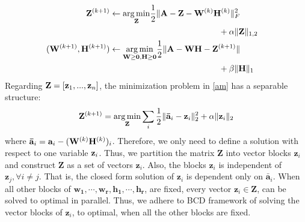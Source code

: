 \begin{equation}
\begin{aligned}
\label{am}
\mathbf{Z}^{(k+1)} & \leftarrow \underset{\mathbf{Z}}{\mathop{\rm arg\,min}} \frac{1}{2}\|\mathbf{A}-\mathbf{Z}-\mathbf{W}^{(k)}\mathbf{H}^{(k)}\|_F^2 \\
                    &\qquad \qquad \qquad \qquad \qquad \qquad \quad     + \alpha \|\mathbf{Z}\|_{1,2}    \\
(\mathbf{W}^{(k+1)},\mathbf{H}^{(k+1)}) & \leftarrow \underset{\mathbf{W\geq0}, \mathbf{H\geq0}}{\mathop{\rm arg\,min}} \frac{1}{2}\|\mathbf{A}-\mathbf{WH}-\mathbf{Z}^{(k+1)}\|  \\
                                        & \qquad \qquad \qquad \qquad \qquad \qquad \quad + \beta \|\mathbf{H}\|_1 &    \\
\end{aligned}
\end{equation}
Regarding ${\bf Z}=[{\bf z}_1,...,{\bf z}_n]$, the minimization
problem in \eqref{am} has a  separable structure:
$$
\mathbf{Z}^{(k+1)} =  \underset{\mathbf{Z}}{\mathop{\rm arg\,min}} \sum_i \frac{1}{2}\|\mathbf{\bar{a}}_i -\mathbf{z}_i\|_2^2+ \alpha \|\mathbf{z}_i\|_{2}
$$
where $\mathbf{\bar{a}}_i = {\bf a}_i - ({\bf W}^{(k)}{\bf
H}^{(k)})_i$. Therefore, we only need to define a solution with
respect to one variable ${\bf z}_i$. Thus, we partition the matrix
$\mathbf{Z}$ into vector blocks $\mathbf{z}_i$ and construct
$\mathbf{Z}$ as a set of vectors $\mathbf{z}_i$. Also, the blocks
$\mathbf{z}_i$ is independent of $\mathbf{z}_j, \forall i \neq j$.
That is, the closed form solution of $\mathbf{z}_i$ is dependent
only on $\mathbf{\bar{a}}_i$. When all other blocks of
$\mathbf{w_1,\cdots,w_r,h_1,\cdots,h_r}$, are fixed, every vector
$\mathbf{z}_i \in \mathbf{Z}$, can be solved to optimal in parallel.
Thus, we adhere to BCD framework of solving the vector blocks of
$\mathbf{z}_i$, to optimal, when all the other blocks are fixed.


